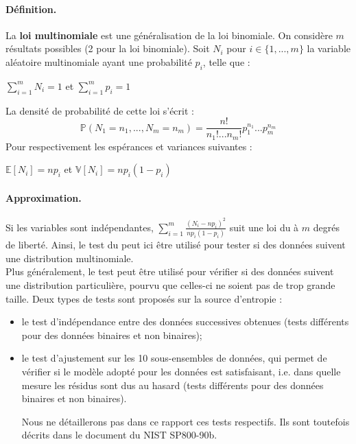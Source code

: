\paragraph{Définition.\\}
La \textbf{loi multinomiale} est une généralisation de la loi binomiale. On considère $m$ résultats possibles (2 pour la loi binomiale). Soit $N_i$ pour $i \in \lbrace1,...,m\rbrace$ la variable aléatoire multinomiale ayant une probabilité $p_i$, telle que :
\begin{center}
$ \sum \limits_{i=1}^{m} N_i = 1$ et $\sum \limits_{i=1}^{m} p_i = 1$ 
\end{center}
La densité de probabilité de cette loi s'écrit : 
$$ \mathbb{P}(N_1=n_1, ..., N_m = n_m) = \frac{n!}{n_1! ... n_m!}p_1^{n_1}...p_m^{n_m}$$
Pour respectivement les espérances et variances suivantes :
\begin{center}
$ \mathbb{E}[N_i]=np_i$ et $\mathbb{V}[N_i]=np_i(1-p_i)$
\end{center}

\paragraph{Approximation.\\}
Si les variables sont indépendantes, $\sum \limits_{i=1}^m \frac{(N_i - np_i)^2}{np_i(1-p_i)}$ suit une loi du \chidpdf à $m$ degrés de liberté. Ainsi, le test du \chidpdf peut ici être utilisé pour tester si des données suivent une distribution multinomiale.\\


Plus généralement, le test peut être utilisé pour vérifier si des données suivent une distribution particulière, pourvu que celles-ci ne soient pas de trop grande taille. Deux types de tests sont proposés sur la source d'entropie : 
\begin{itemize}
\item le test d'indépendance entre des données successives obtenues (tests différents pour des données binaires et non binaires);
\item le test d'ajustement sur les 10 sous-ensembles de données, qui permet de vérifier si le modèle adopté pour les données est satisfaisant, i.e. dans quelle mesure les résidus sont dus au hasard (tests différents pour des données binaires et non binaires).

Nous ne détaillerons pas dans ce rapport ces tests respectifs. Ils sont toutefois décrits dans le document du NIST SP800-90b.\\

\end{itemize}



